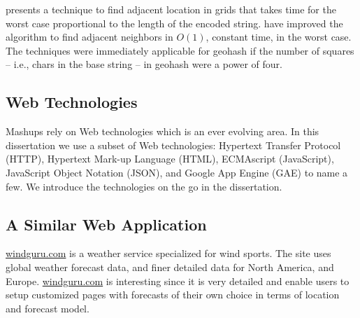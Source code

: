 \citep{linearquadtree:gargantini} presents a technique to find adjacent location
in grids that takes time for the worst case proportional to the length of the
encoded string. \citep{constantlqtree:aizawa} have improved the algorithm to find
adjacent neighbors in $O(1)$, constant time, in the worst case. The techniques
were immediately applicable for geohash if the number of squares -- i.e., chars
in the base string -- in geohash were a power of four.

\subsection{Web Technologies}
Mashups rely on Web technologies which is an ever evolving area. In this
dissertation we use a subset of Web technologies: Hypertext Transfer Protocol
(HTTP), Hypertext Mark-up Language (HTML), ECMAscript (JavaScript), JavaScript
Object Notation (JSON), and Google App Engine (GAE) to name a few. We introduce
the technologies on the go in the dissertation.






\subsection{A Similar Web Application}
\url{windguru.com} is a weather service specialized for wind sports. The site
uses global weather forecast data, and finer detailed data for North America, and
Europe. \url{windguru.com} is interesting since it is very detailed and enable
users to setup customized pages with forecasts of their own choice in terms of
location and forecast model.
